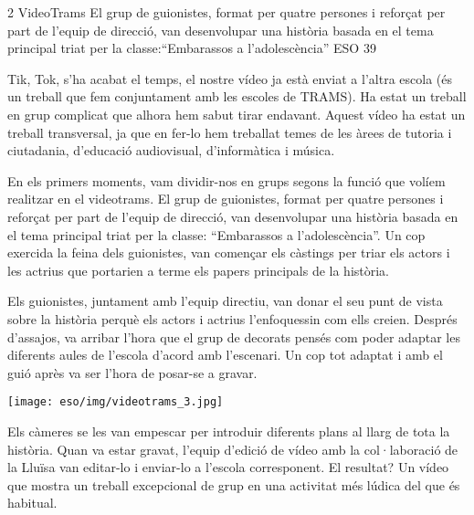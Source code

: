 \begin{news}
{2} %
{VideoTrams}
{El grup de guionistes, format per quatre persones i reforçat per part de l'equip de direcció, van desenvolupar una història basada en el tema principal triat per la classe:“Embarassos a l'adolescència” }
{ESO}
{39} %


Tik, Tok, s'ha acabat el temps, el nostre vídeo ja està enviat a l'altra escola (és un treball que fem conjuntament amb les escoles de TRAMS). Ha estat un treball en grup complicat que alhora hem sabut tirar endavant. Aquest vídeo ha estat un treball transversal, ja que en fer-lo  hem treballat temes de les àrees de tutoria i ciutadania, d'educació audiovisual, d'informàtica i música. 

En els primers moments,  vam dividir-nos en grups segons la funció que volíem realitzar en el videotrams. El grup de guionistes, format per quatre persones i reforçat per part de l'equip de direcció, van desenvolupar una història basada en el tema principal triat per la classe: “Embarassos a l'adolescència”. Un cop exercida la feina dels guionistes, van començar els càstings per triar els actors i les actrius que portarien a terme els papers principals de la història.



Els guionistes, juntament amb l'equip directiu,  van donar el seu punt de vista sobre la història perquè els actors i actrius l'enfoquessin com ells creien. Després d'assajos, va arribar l'hora que el grup de decorats pensés com poder adaptar les diferents aules de l'escola d'acord amb l'escenari. Un cop tot adaptat i amb el guió après va ser l'hora de posar-se a gravar. 

\noindent\texttt{[image: eso/img/videotrams\_3.jpg]}

Els càmeres se les van empescar per introduir diferents plans  al llarg de tota la història.  Quan va estar gravat, l'equip d'edició de vídeo amb la col·laboració de la Lluïsa  van editar-lo i enviar-lo a l'escola corresponent. El resultat? Un vídeo que mostra un treball excepcional de grup en una activitat més lúdica  del que és habitual.


\end{news}

\newssep
{}

